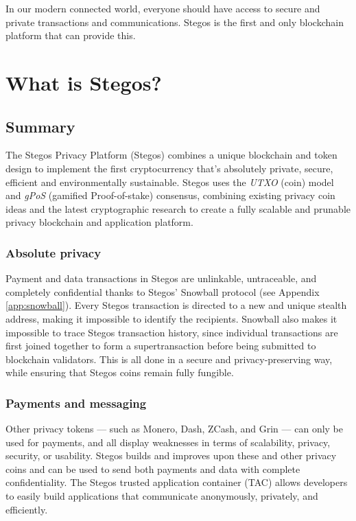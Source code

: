 \documentclass[8pt,fleqn,openany]{book}
\begin{document}
In our modern connected world, everyone should have access to secure and private transactions and communications. Stegos is the first and only blockchain platform that can provide this.  

	\chapter{What is Stegos?}\label{chap:what-is-stegos}
	
	\section{Summary}
	The Stegos Privacy Platform (Stegos) combines a unique blockchain and token design to implement the first cryptocurrency that’s absolutely private, secure, efficient and environmentally sustainable. Stegos uses the \textit{UTXO} (coin) model and \textit{gPoS} (gamified Proof-of-stake) consensus, combining existing privacy coin ideas and the latest cryptographic research to create a fully scalable and prunable privacy blockchain and application platform. 
	
	\subsection{Absolute privacy}
	Payment and data transactions in Stegos are unlinkable, untraceable, and completely confidential thanks to Stegos' Snowball protocol (see Appendix \ref{app:snowball}). Every Stegos transaction is directed to a new and unique stealth address, making it impossible to identify the recipients. Snowball also makes it impossible to trace Stegos transaction history, since individual transactions are first joined together to form a supertransaction before being submitted to blockchain validators. This is all done in a secure and privacy-preserving way, while ensuring that Stegos coins remain fully fungible.
	
	\subsection{Payments and messaging}
	Other privacy tokens — such as Monero, Dash, ZCash, and Grin — can only be used for payments, and all display weaknesses in terms of scalability, privacy, security, or usability. Stegos builds and improves upon these and other privacy coins and can be used to send both payments and data with complete confidentiality. The Stegos trusted application container (TAC) allows developers to easily build applications that communicate anonymously, privately, and efficiently.
	
\end{document}

